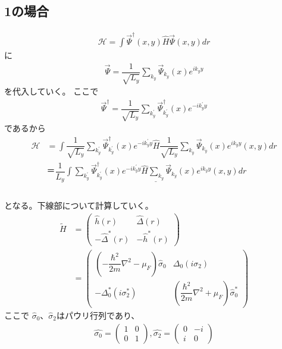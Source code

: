 \documentclass{jarticle}
\begin{document}
\subsection{1の場合}
	\begin{align}
	\mathcal{H}=\int\vec{\Psi}^\dagger(x,y)\hat{H}\vec{\Psi}(x,y)dr
	\end{align}
	に
	\begin{align}
	\vec{\Psi}=\dfrac{1}{\sqrt{L_y}}\displaystyle\sum_{k_y}\vec{\Psi}_{k_y}(x)e^{ik_yy}
	\end{align}
	を代入していく。
	ここで
	\begin{align}
	\vec{\Psi}^\dagger=\dfrac{1}{\sqrt{L_y}}\displaystyle\sum_{k_y^{'}}\vec{\Psi}^\dagger_{k_y^{'}}(x)e^{-ik_y^{'}y}
	\end{align}
	であるから
	\begin{align}
	\mathcal{H}&=\int\dfrac{1}{\sqrt{L_y}}\displaystyle\sum_{k_y^{'}}\vec{\Psi}^\dagger_{k_y^{'}}(x)e^{-ik_y^{'}y}\hat{H}\dfrac{1}{\sqrt{L_y}}\displaystyle\sum_{k_y}\vec{\Psi}_{k_y}(x)e^{ik_yy}(x,y)dr\\&＝\dfrac{1}{L_y}\underline{\int\displaystyle\sum_{k_y^{'}}\vec{\Psi}^\dagger_{k_y^{'}}(x)e^{-ik_y^{'}y}\hat{H}\displaystyle\sum_{k_y}\vec{\Psi}_{k_y}(x)e^{ik_yy}(x,y)dr}\\
	\label{star}
	\end{align}
	\\となる。下線部について計算していく。
	\begin{align}
	\tilde{H}&=
	\begin{pmatrix}
	\hat{h}(r) & \hat{\Delta}(r) \\
	-\hat{\Delta}^{*}(r) & -\hat{h}^{*}(r)
	\end{pmatrix}
	\\&=
	\begin{pmatrix}
	(-\dfrac{\hbar^2}{2m}\nabla^2-\mu_F)\hat{\sigma}_0 & \Delta_0(i\sigma_2) \\
	-\Delta^{*}_0(i\sigma^{*}_2) & (\dfrac{\hbar^2}{2m}\nabla^2+\mu_F)\hat{\sigma}^{*}_0		
	\end{pmatrix}
	\end{align}
	ここで
	$\hat\sigma_0$、$\hat\sigma_2$はパウリ行列であり、
	\begin{align}
	\hat{\sigma_0}=
	\begin{pmatrix}
	1 & 0 \\
	0 & 1
	\end{pmatrix},
	\hat{\sigma_2}=
	\begin{pmatrix}
	0 & -i \\
	i & 0
	\end{pmatrix}
	\end{align}
\end{document}
